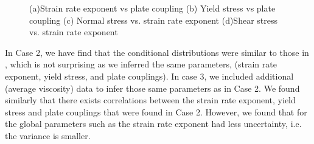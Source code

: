 \documentclass[12pt]{article}
\begin{document}
\begin{figure}[H]
\centering
\hspace{-0.2cm}
\hspace{-0.2cm}
\hspace{-0.2cm}
\hspace{-0.2cm}
\caption{(a)Strain rate exponent vs plate coupling (b) Yield stress vs plate coupling (c) Normal  stress vs. strain rate exponent (d)Shear  stress vs. strain rate exponent}
\label{fig:distrib}
\end{figure}


In Case 2, we have find that the conditional distributions were similar to those in \citep{ratnaswamy2015adjoint}, which is not surprising as we inferred the same parameters, (strain rate exponent, yield stress, and plate couplings). In case 3, we included additional (average viscosity) data to infer those same parameters as in Case 2. We found similarly that there exists correlations between the strain rate exponent, yield stress and plate couplings that were found in Case 2. However, we found that for the global parameters such as the strain rate exponent had less uncertainty, i.e. the variance is smaller.
\end{document}
